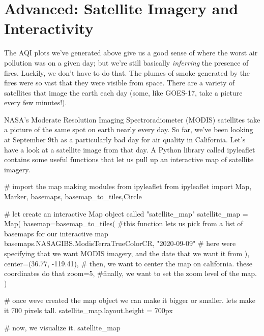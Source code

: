\documentclass[
  letterpaper,
  DIV=11,
  numbers=noendperiod]{scrreprt}
\newenvironment{Shaded}{\begin{snugshade}}{\end{snugshade}}
\newcommand{\CommentTok}[1]{\textcolor[rgb]{0.37,0.37,0.37}{#1}}
\newcommand{\DecValTok}[1]{\textcolor[rgb]{0.68,0.00,0.00}{#1}}
\newcommand{\FloatTok}[1]{\textcolor[rgb]{0.68,0.00,0.00}{#1}}
\newcommand{\ImportTok}[1]{\textcolor[rgb]{0.00,0.46,0.62}{#1}}
\newcommand{\NormalTok}[1]{\textcolor[rgb]{0.00,0.23,0.31}{#1}}
\newcommand{\OperatorTok}[1]{\textcolor[rgb]{0.37,0.37,0.37}{#1}}
\newcommand{\StringTok}[1]{\textcolor[rgb]{0.13,0.47,0.30}{#1}}
\begin{document}
\hypertarget{advanced-satellite-imagery-and-interactivity}{%
\section{Advanced: Satellite Imagery and
Interactivity}\label{advanced-satellite-imagery-and-interactivity}}

The AQI plots we've generated above give us a good sense of where the
worst air pollution was on a given day; but we're still basically
\emph{inferring} the presence of fires. Luckily, we don't have to do
that. The plumes of smoke generated by the fires were so vast that they
were visible from space. There are a variety of satellites that image
the earth each day (some, like GOES-17, take a picture every few
minutes!).

NASA's Moderate Resolution Imaging Spectroradiometer (MODIS) satellites
take a picture of the same spot on earth nearly every day. So far, we've
been looking at September 9th as a particularly bad day for air quality
in California. Let's have a look at a satellite image from that day. A
Python library called ipyleaflet contains some useful functions that let
us pull up an interactive map of satellite imagery.

\begin{Shaded}
\begin{Highlighting}[]
\CommentTok{\# import the map making modules from ipyleaflet}
\ImportTok{from}\NormalTok{ ipyleaflet }\ImportTok{import}\NormalTok{ Map, Marker, basemaps, basemap\_to\_tiles,Circle}

\CommentTok{\# let create an interactive Map object called "satellite\_map"}
\NormalTok{satellite\_map }\OperatorTok{=}\NormalTok{ Map(}
\NormalTok{  basemap}\OperatorTok{=}\NormalTok{basemap\_to\_tiles( }\CommentTok{\#this function lets us pick from a list of basemaps for our interactive map}
\NormalTok{    basemaps.NASAGIBS.ModisTerraTrueColorCR, }\StringTok{"2020{-}09{-}09"} \CommentTok{\# here we\textquotesingle{}re specifying that we want MODIS imagery, and the date that we want it from  }
\NormalTok{  ),}
\NormalTok{  center}\OperatorTok{=}\NormalTok{(}\FloatTok{36.77}\NormalTok{, }\OperatorTok{{-}}\FloatTok{119.41}\NormalTok{), }\CommentTok{\# then, we want to center the map on california. these coordinates do that}
\NormalTok{  zoom}\OperatorTok{=}\DecValTok{5}\NormalTok{, }\CommentTok{\#finally, we want to set the zoom level of the map. }
\NormalTok{)}

\CommentTok{\# once we\textquotesingle{}ve created the map object we can make it bigger or smaller. let\textquotesingle{}s make it 700 pixels tall. }
\NormalTok{satellite\_map.layout.height }\OperatorTok{=} \StringTok{\textquotesingle{}700px\textquotesingle{}}

\CommentTok{\# now, we visualize it.}
\NormalTok{satellite\_map}
\end{Highlighting}
\end{Shaded}
\end{document}
